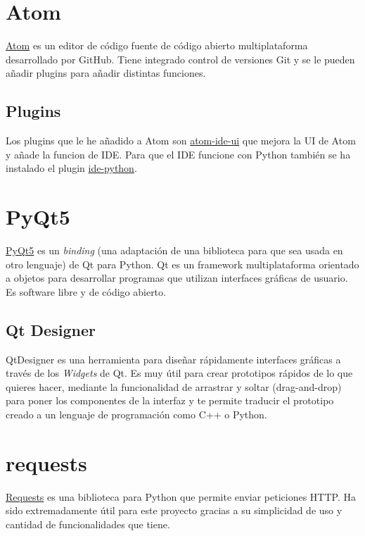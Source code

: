\section{Atom}

\href{https://atom.io/}{Atom}\cite{AtomSoftware2020} es un editor de código fuente de código abierto multiplataforma desarrollado por GitHub. Tiene integrado control de versiones Git y se le pueden añadir plugins para añadir distintas funciones.

\subsection{Plugins}

Los plugins que le he añadido a Atom son \href{https://atom.io/packages/atom-ide-ui}{atom-ide-ui} que mejora la UI de Atom y añade la funcion de IDE. Para que el IDE funcione con Python también se ha instalado el plugin \href{https://atom.io/packages/ide-python}{ide-python}.

\section{PyQt5}

\href{https://doc.qt.io/qtforpython/}{PyQt5}\cite{PyQt2020} es un \textit{binding} (una adaptación de una biblioteca para que sea usada en otro lenguaje) de Qt para Python. Qt es un framework multiplataforma orientado a objetos para desarrollar programas que utilizan interfaces gráficas de usuario. Es software libre y de código abierto.

\subsection{Qt Designer}
QtDesigner\cite{QtDesignerManual} es una herramienta para diseñar rápidamente interfaces gráficas a través de los \textit{Widgets} de Qt. Es muy útil para crear prototipos rápidos de lo que quieres hacer, mediante la funcionalidad de arrastrar y soltar (drag-and-drop) para poner los componentes de la interfaz y te permite traducir el prototipo creado a un lenguaje de programación como C++ o Python.


\section{requests}

\href{https://requests.readthedocs.io/es/latest/}{Requests} es una biblioteca para Python que permite enviar peticiones HTTP. Ha sido extremadamente útil para este proyecto gracias a su simplicidad de uso y cantidad de funcionalidades que tiene.

